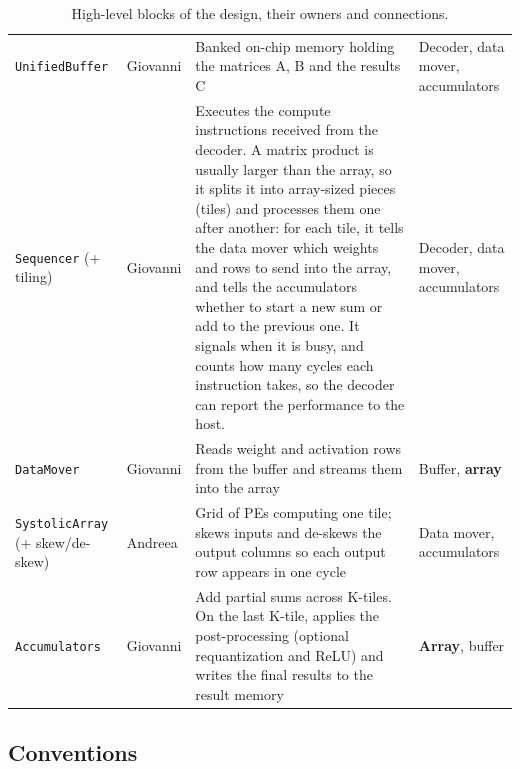 \documentclass{article}
\begin{document}
\begin{landscape}
\begin{table}[p]
\begin{tabularx}{\linewidth}{@{} l l >{\raggedright\arraybackslash}X >{\raggedright\arraybackslash}p{5cm} @{}}
    \texttt{UnifiedBuffer} & Giovanni
      & Banked on-chip memory holding the matrices A, B and the results C
      & Decoder, data mover, accumulators \\
    \texttt{Sequencer} (+ tiling) & Giovanni
      & Executes the compute instructions received from the
    decoder. A matrix product is usually larger than the array, so it splits it
    into array-sized pieces (tiles) and processes them one after another: for
    each tile, it tells the data mover which weights and rows to send into the
    array, and tells the accumulators whether to start a new sum or add to the
    previous one. It signals when it is busy, and counts how many cycles each
    instruction takes, so the decoder can report the performance to the host.
      & Decoder, data mover, accumulators \\
    \texttt{DataMover} & Giovanni
      & Reads weight and activation rows from the buffer and streams them into the array
      & Buffer, \textbf{array} \\
    \texttt{SystolicArray} (+ skew/de-skew) & Andreea
      & Grid of PEs computing one tile; skews inputs and de-skews the output columns so each output row appears in one cycle
      & Data mover, accumulators \\
    \texttt{Accumulators} & Giovanni
      & Add partial sums across K-tiles. On the last K-tile, applies the post-processing (optional requantization and ReLU) and writes the final results to the result memory
      & \textbf{Array}, buffer \\
    \bottomrule
  \end{tabularx}
  \caption{High-level blocks of the design, their owners and connections.}
  \label{tab:blocks}
\end{table}
\end{landscape}


\newcommand{\porthead}{%
  \toprule
  \textbf{Port} & \textbf{Dir} & \textbf{Type} & \textbf{Proto} & \textbf{Connected to} & \textbf{Description} \\
  \midrule}

\subsection*{Conventions}
\end{document}
